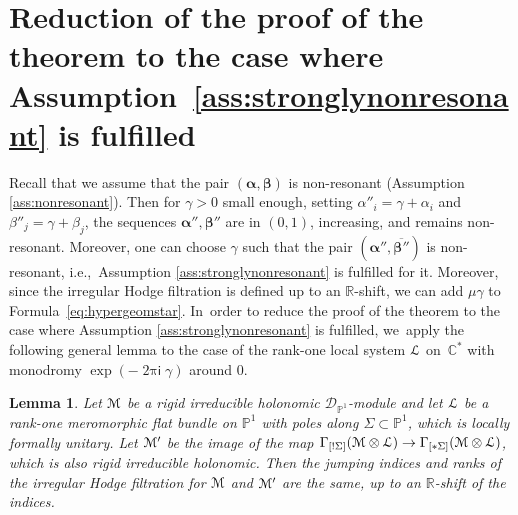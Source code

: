 \documentclass[11pt]{article}
\let\mathcal\mathscr
\newtheorem{lemme}{Lemma}
\def\cD{\mathcal{D}}
\def\CC{\mathbb{C}}
\def\PP{\mathbb{P}}
\def\RR{\mathbb{R}}
\def\ccL{\EuScript{L}}
\def\ccM{\EuScript{M}}
\def\alphag{\boldsymbol{\alpha}}
\def\betag{\boldsymbol{\beta}}
\def\ie{i.e.,\ }
\let\ov\overline
\newcommand{\sfi}{\mathsf{i}}
\DeclareMathOperator{\twopii}{2\pi\sfi}
\def\to{\mathchoice{\longrightarrow}{\rightarrow}{\rightarrow}{\rightarrow}}
\begin{document}
\section{Reduction of the proof of the theorem to the case where Assumption~\ref{ass:stronglynonresonant} is fulfilled}

Recall that we assume that the pair $(\alphag,\betag)$ is non-resonant (Assumption \ref{ass:nonresonant}). Then for $\gamma>0$ small enough, setting $\alpha''_i=\gamma+\alpha_i$ and $\beta''_j=\gamma+\beta_j$, the sequences $\alphag'',\betag''$ are in $(0,1)$, increasing, and remains non-resonant. Moreover, one can choose $\gamma$ such that the pair $(\alphag'',\ov{\betag''})$ is non-resonant, \ie Assumption \ref{ass:stronglynonresonant} is fulfilled for it. Moreover, since the irregular Hodge filtration is defined up to an $\RR$-shift, we can add $\mu\gamma$ to Formula~\eqref{eq:hypergeomstar}. In~order to reduce the proof of the theorem to the case where Assumption \ref{ass:stronglynonresonant} is fulfilled, we~apply the following general lemma to the case of the rank-one local system $\ccL$ on~$\CC^*$ with monodromy $\exp(-\twopii\gamma)$ around $0$.

\begin{lemme}
Let $\ccM$ be a rigid irreducible holonomic $\cD_{\PP^1}$-module and let $\ccL$ be a rank-one meromorphic flat bundle on $\PP^1$ with poles along $\Sigma\subset\PP^1$, which is locally formally unitary. Let $\ccM'$ be the image of the map $\Gamma_{[!\Sigma]}(\ccM\otimes\ccL)\to\Gamma_{[*\Sigma]}(\ccM\otimes\ccL)$, which is also rigid irreducible holonomic. Then the jumping indices and ranks of the irregular Hodge filtration for $\ccM$ and $\ccM'$ are the same, up to an $\RR$-shift of the indices.
\end{lemme}
\end{document}
